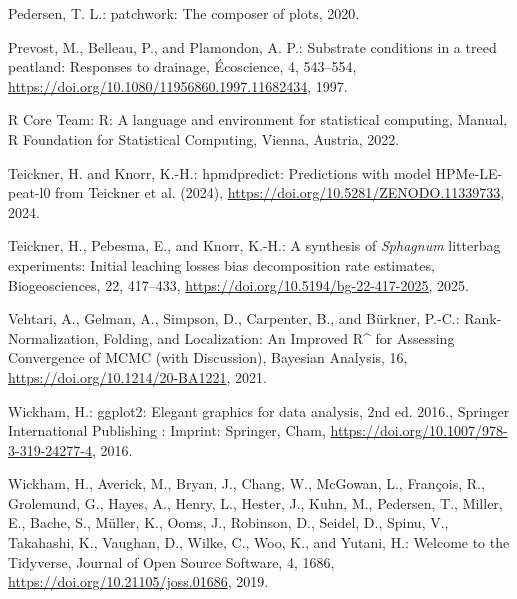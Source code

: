 \documentclass[
  12pt,
]{article}
\newlength{\cslhangindent}
\newlength{\cslentryspacingunit} %
\newenvironment{CSLReferences}[2] %
 {%
  \setlength{\parindent}{0pt}
  \ifodd #1
  \let\oldpar\par
  \def\par{\hangindent=\cslhangindent\oldpar}
  \fi
  \setlength{\parskip}{#2\cslentryspacingunit}
 }%
 {}
\begin{document}
\begin{CSLReferences}{0}{0}
\leavevmode{}%
Pedersen, T. L.: {patchwork}: {The} composer of plots, 2020.

\leavevmode{}%
Prevost, M., Belleau, P., and Plamondon, A. P.: Substrate conditions in a treed peatland: {Responses} to drainage, {É}coscience, 4, 543--554, \url{https://doi.org/10.1080/11956860.1997.11682434}, 1997.

\leavevmode{}%
R Core Team: R: {A} language and environment for statistical computing, Manual, R Foundation for Statistical Computing, Vienna, Austria, 2022.

\leavevmode{}%
Teickner, H. and Knorr, K.-H.: {hpmdpredict}: {Predictions} with model {HPMe-LE-peat-l0} from {Teickner} et al. (2024), \url{https://doi.org/10.5281/ZENODO.11339733}, 2024.

\leavevmode{}%
Teickner, H., Pebesma, E., and Knorr, K.-H.: A synthesis of {\emph{Sphagnum}} litterbag experiments: Initial leaching losses bias decomposition rate estimates, Biogeosciences, 22, 417--433, \url{https://doi.org/10.5194/bg-22-417-2025}, 2025.

\leavevmode{}%
Vehtari, A., Gelman, A., Simpson, D., Carpenter, B., and Bürkner, P.-C.: Rank-{Normalization}, {Folding}, and {Localization}: {An Improved R{\^{}}} for {Assessing Convergence} of {MCMC} (with {Discussion}), Bayesian Analysis, 16, \url{https://doi.org/10.1214/20-BA1221}, 2021.

\leavevmode{}%
Wickham, H.: {ggplot2}: {Elegant} graphics for data analysis, 2nd ed. 2016., Springer International Publishing : Imprint: Springer, Cham, \url{https://doi.org/10.1007/978-3-319-24277-4}, 2016.

\leavevmode{}%
Wickham, H., Averick, M., Bryan, J., Chang, W., McGowan, L., François, R., Grolemund, G., Hayes, A., Henry, L., Hester, J., Kuhn, M., Pedersen, T., Miller, E., Bache, S., Müller, K., Ooms, J., Robinson, D., Seidel, D., Spinu, V., Takahashi, K., Vaughan, D., Wilke, C., Woo, K., and Yutani, H.: Welcome to the {Tidyverse}, Journal of Open Source Software, 4, 1686, \url{https://doi.org/10.21105/joss.01686}, 2019.

\end{CSLReferences}
\end{document}
